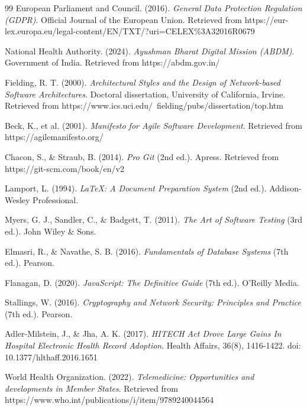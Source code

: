 \begin{thebibliography}{99}
European Parliament and Council. (2016). \textit{General Data Protection Regulation (GDPR)}. Official Journal of the European Union. Retrieved from https://eur-lex.europa.eu/legal-content/EN/TXT/?uri=CELEX\%3A32016R0679

National Health Authority. (2024). \textit{Ayushman Bharat Digital Mission (ABDM)}. Government of India. Retrieved from https://abdm.gov.in/

Fielding, R. T. (2000). \textit{Architectural Styles and the Design of Network-based Software Architectures}. Doctoral dissertation, University of California, Irvine. Retrieved from https://www.ics.uci.edu/~fielding/pubs/dissertation/top.htm

Beck, K., et al. (2001). \textit{Manifesto for Agile Software Development}. Retrieved from https://agilemanifesto.org/

Chacon, S., \& Straub, B. (2014). \textit{Pro Git} (2nd ed.). Apress. Retrieved from https://git-scm.com/book/en/v2

Lamport, L. (1994). \textit{LaTeX: A Document Preparation System} (2nd ed.). Addison-Wesley Professional.

Myers, G. J., Sandler, C., \& Badgett, T. (2011). \textit{The Art of Software Testing} (3rd ed.). John Wiley \& Sons.

Elmasri, R., \& Navathe, S. B. (2016). \textit{Fundamentals of Database Systems} (7th ed.). Pearson.

Flanagan, D. (2020). \textit{JavaScript: The Definitive Guide} (7th ed.). O'Reilly Media.

Stallings, W. (2016). \textit{Cryptography and Network Security: Principles and Practice} (7th ed.). Pearson.

Adler-Milstein, J., \& Jha, A. K. (2017). \textit{HITECH Act Drove Large Gains In Hospital Electronic Health Record Adoption}. Health Affairs, 36(8), 1416-1422. doi: 10.1377/hlthaff.2016.1651

World Health Organization. (2022). \textit{Telemedicine: Opportunities and developments in Member States}. Retrieved from https://www.who.int/publications/i/item/9789240044564


\end{thebibliography}
